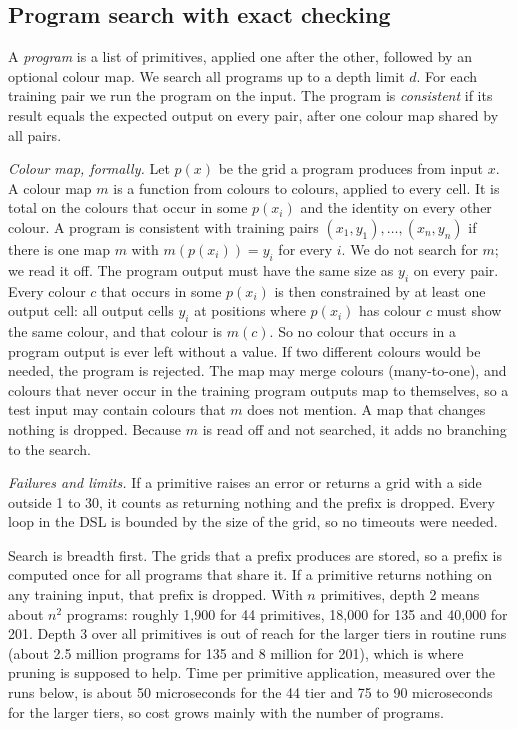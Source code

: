 \documentclass[sigconf,nonacm]{acmart}
\begin{document}
\subsection{Program search with exact checking}

A \emph{program} is a list of primitives, applied one after the other, followed by an optional colour map. We search all programs up to a depth limit $d$. For each training pair we run the program on the input. The program is \emph{consistent} if its result equals the expected output on every pair, after one colour map shared by all pairs.

\emph{Colour map, formally.} Let $p(x)$ be the grid a program produces from input $x$. A colour map $m$ is a function from colours to colours, applied to every cell. It is total on the colours that occur in some $p(x_i)$ and the identity on every other colour. A program is consistent with training pairs $(x_1,y_1),\dots,(x_n,y_n)$ if there is one map $m$ with $m(p(x_i))=y_i$ for every $i$. We do not search for $m$; we read it off. The program output must have the same size as $y_i$ on every pair. Every colour $c$ that occurs in some $p(x_i)$ is then constrained by at least one output cell: all output cells $y_i$ at positions where $p(x_i)$ has colour $c$ must show the same colour, and that colour is $m(c)$. So no colour that occurs in a program output is ever left without a value. If two different colours would be needed, the program is rejected. The map may merge colours (many-to-one), and colours that never occur in the training program outputs map to themselves, so a test input may contain colours that $m$ does not mention. A map that changes nothing is dropped. Because $m$ is read off and not searched, it adds no branching to the search.

\emph{Failures and limits.} If a primitive raises an error or returns a grid with a side outside 1 to 30, it counts as returning nothing and the prefix is dropped. Every loop in the DSL is bounded by the size of the grid, so no timeouts were needed.

Search is breadth first. The grids that a prefix produces are stored, so a prefix is computed once for all programs that share it. If a primitive returns nothing on any training input, that prefix is dropped. With $n$ primitives, depth 2 means about $n^2$ programs: roughly 1{,}900 for 44 primitives, 18{,}000 for 135 and 40{,}000 for 201. Depth 3 over all primitives is out of reach for the larger tiers in routine runs (about 2.5 million programs for 135 and 8 million for 201), which is where pruning is supposed to help. Time per primitive application, measured over the runs below, is about 50 microseconds for the 44 tier and 75 to 90 microseconds for the larger tiers, so cost grows mainly with the number of programs.
\end{document}
